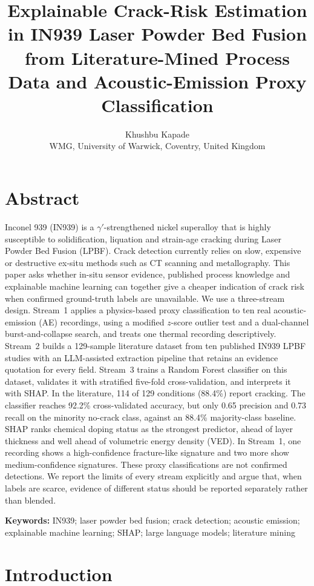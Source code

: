 \documentclass[a4paper]{article}
\title{\textbf{Explainable Crack-Risk Estimation in IN939 Laser Powder Bed Fusion from Literature-Mined Process Data and Acoustic-Emission Proxy Classification}}
\author{Khushbu Kapade\\[2pt]
\small WMG, University of Warwick, Coventry, United Kingdom}
\date{}
\begin{document}
\maketitle

\section*{Abstract}
Inconel 939 (IN939) is a $\gamma'$-strengthened nickel superalloy that is highly susceptible to solidification, liquation and strain-age cracking during Laser Powder Bed Fusion (LPBF). Crack detection currently relies on slow, expensive or destructive ex-situ methods such as CT scanning and metallography. This paper asks whether in-situ sensor evidence, published process knowledge and explainable machine learning can together give a cheaper indication of crack risk when confirmed ground-truth labels are unavailable. We use a three-stream design. Stream~1 applies a physics-based proxy classification to ten real acoustic-emission (AE) recordings, using a modified $z$-score outlier test and a dual-channel burst-and-collapse search, and treats one thermal recording descriptively. Stream~2 builds a 129-sample literature dataset from ten published IN939 LPBF studies with an LLM-assisted extraction pipeline that retains an evidence quotation for every field. Stream~3 trains a Random Forest classifier on this dataset, validates it with stratified five-fold cross-validation, and interprets it with SHAP. In the literature, 114 of 129 conditions (88.4\%) report cracking. The classifier reaches 92.2\% cross-validated accuracy, but only 0.65 precision and 0.73 recall on the minority no-crack class, against an 88.4\% majority-class baseline. SHAP ranks chemical doping status as the strongest predictor, ahead of layer thickness and well ahead of volumetric energy density (VED). In Stream~1, one recording shows a high-confidence fracture-like signature and two more show medium-confidence signatures. These proxy classifications are not confirmed detections. We report the limits of every stream explicitly and argue that, when labels are scarce, evidence of different status should be reported separately rather than blended.


\medskip\noindent\textbf{Keywords:} IN939; laser powder bed fusion; crack detection; acoustic emission; explainable machine learning; SHAP; large language models; literature mining

\section{Introduction}
\end{document}
